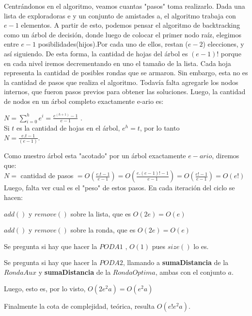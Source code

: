 \documentclass[10pt, a4paper]{article}
\begin{document}
Centrándonos en el algoritmo, veamos cuantas "pasos" toma realizarlo.  Dada una lista de exploradoras e y un conjunto de amistades a, el algoritmo trabaja con $e-1$ elementos. A partir de esto, podemos pensar el algoritmo de backtracking como un árbol de decisión, donde luego de colocar el primer nodo raíz, elegimos entre $e-1$ posibilidades(hijos).Por cada uno de ellos, restan ($e-2$) elecciones, y así siguiendo. De esta forma, la cantidad de hojas del árbol es $(e-1)!$ porque en cada nivel iremos decrementando en uno el tamaño de la lista. Cada hoja representa la cantidad de posibles rondas que se armaron. Sin embargo, esta no es la cantidad de pasos que realiza el algoritmo. Todavía falta agregarle los nodos internos, que fueron pasos previos para obtener las soluciones. Luego, la cantidad de nodos en un árbol completo  exactamente e-ario es:

\hspace{60mm}$N = \sum\limits_{i=0}^h e ^i = \frac{e^{(h+1)} -1}{e-1} $ . \\


Si $t$ es la cantidad de hojas en el árbol, $e^{h} = t$, por lo tanto  \\


\hspace{60mm} $N = \frac{e.t -1}{(e-1)}$.

Como nuestro árbol esta "acotado" por un árbol exactamente  $e-ario$, diremos que:\\

\hspace{30mm}$N = $ cantidad de pasos $= O(\frac{e.t -1}{e-1}) = O(\frac{e.(e-1)! -1}{e-1}) = O(\frac{e! -1}{e-1}) = O(e!)$\\

Luego, falta ver cual es el "peso" de estos pasos. En cada iteración del ciclo se hacen:

$add()$ y $remove()$ sobre la lista, que es $O(2e) = O(e)$

$add()$ y $remove()$ sobre la ronda, que es $O(2e) = O(e)$

Se pregunta si hay que hacer la $PODA1$ , $O(1)$ pues $size()$ lo es.

Se pregunta si hay que hacer la $PODA2$, llamando a \textbf{sumaDistancia} de la $RondaAux$ y \textbf{sumaDistancia} de la $RondaOptima$, ambas con el conjunto $a$. 

Luego, esto es, por lo visto, $O(2e^{2}a) = O(e^{2}a)$

Finalmente la cota de complejidad, teórica, resulta $O(e!e^{2}a)$.
\end{document}
